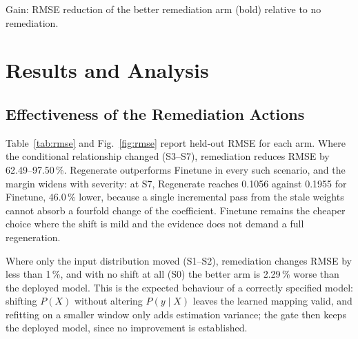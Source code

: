 \documentclass[conference]{IEEEtran}
\begin{document}
\begin{table}[t]
\centering
\caption{Held-Out RMSE by Scenario and Remediation Action}
\label{tab:rmse}
\footnotesize
\setlength{\tabcolsep}{2.6pt}

\vspace{2pt}
\parbox{\columnwidth}{\scriptsize Gain: RMSE reduction of the better remediation arm (bold)
relative to no remediation.}
\end{table}

\section{Results and Analysis}
\label{sec:results}

\subsection{Effectiveness of the Remediation Actions}
Table~\ref{tab:rmse} and Fig.~\ref{fig:rmse} report held-out RMSE for each arm. Where the
conditional relationship changed (S3--S7), remediation reduces RMSE by 62.49--97.50\,\%.
Regenerate outperforms Finetune in every such scenario, and the margin widens with severity: at
S7, Regenerate reaches 0.1056 against 0.1955 for Finetune, 46.0\,\% lower, because a single
incremental pass from the stale weights cannot absorb a fourfold change of the coefficient.
Finetune remains the cheaper choice where the shift is mild and the evidence does not demand a
full regeneration.

Where only the input distribution moved (S1--S2), remediation changes RMSE by less than 1\,\%,
and with no shift at all (S0) the better arm is 2.29\,\% worse than the deployed model. This is
the expected behaviour of a correctly specified model: shifting $P(X)$ without altering
$P(y\mid X)$ leaves the learned mapping valid, and refitting on a smaller window only adds
estimation variance; the gate then keeps the deployed model, since no improvement is established.
\end{document}
